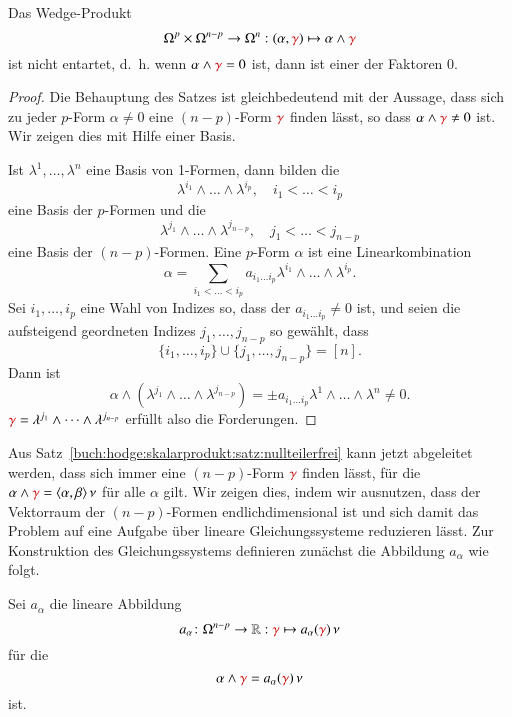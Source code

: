 \begin{satz}
\label{buch:hodge:skalarprodukt:satz:nullteilerfrei}
Das Wedge-Produkt
\[
\Omega^p \times \Omega^{n-p}
\to
\Omega^n
:
(\alpha,{\color{darkred}\gamma})
\mapsto
\alpha\wedge{\color{darkred}\gamma}
\]
ist nicht entartet, d.~h. wenn $\alpha\wedge{\color{darkred}\gamma}=0$
ist, dann ist einer der Faktoren 0.
\end{satz}

\begin{proof}
Die Behauptung des Satzes ist gleichbedeutend mit der Aussage, dass 
sich zu jeder $p$-Form $\alpha\ne 0$ eine $(n-p)$-Form ${\color{darkred}\gamma}$
finden lässt, so dass $\alpha\wedge{\color{darkred}\gamma}\ne  0$ ist.
Wir zeigen dies mit Hilfe einer Basis.

Ist $\lambda^1,\dots,\lambda^n$ eine Basis von 1-Formen, dann bilden
die
\[
\lambda^{i_1}\wedge\dots\wedge\lambda^{i_p},\quad i_1<\dots<i_p
\]
eine Basis der $p$-Formen und die
\[
\lambda^{j_1}\wedge\dots\wedge\lambda^{j_{n-p}},\quad j_1<\dots<j_{n-p}
\]
eine Basis der $(n-p)$-Formen.
Eine $p$-Form $\alpha$ ist eine Linearkombination
\[
\alpha
=
\sum_{i_1<\dots<i_p}
a_{i_1\dots i_p} \lambda^{i_1}\wedge\dots\wedge \lambda^{i_p}.
\]
Sei $i_1,\dots,i_p$ eine Wahl von Indizes so, dass
der $a_{i_1\dots i_p}\ne 0$ ist, und seien die aufsteigend geordneten
Indizes $j_1,\dots,j_{n-p}$ so gewählt, dass
\[
\{i_1,\dots,i_p\}\cup\{j_1,\dots,j_{n-p}\} = [n].
\]
Dann ist
\[
\alpha\wedge(\lambda^{j_1}\wedge\dots\wedge\lambda^{j_{n-p}})
=
\pm
a_{i_1\dots i_p} \lambda^1\wedge\dots\wedge\lambda^n
\ne
0.
\]
${\color{darkred}\gamma}=\lambda^{j_1}\wedge\dots\wedge\lambda^{j_{n-p}}$
erfüllt also die Forderungen.
\end{proof}

Aus Satz~\ref{buch:hodge:skalarprodukt:satz:nullteilerfrei} kann jetzt
abgeleitet werden, dass sich immer eine $(n-p)$-Form ${\color{darkred}\gamma}$
finden lässt, für die $\alpha\wedge{\color{darkred}\gamma}=
\langle\alpha,\beta\rangle\,\nu$ für alle $\alpha$ gilt.
Wir zeigen dies, indem wir ausnutzen, dass der Vektorraum der
$(n-p)$-Formen endlichdimensional ist und sich damit das Problem
auf eine Aufgabe über lineare Gleichungssysteme reduzieren lässt.
Zur Konstruktion des Gleichungssystems definieren zunächst die
Abbildung $a_\alpha$ wie folgt.

\begin{definition}
\label{buch:hodge:koordinatenfrei:def:hodgekoordinatenfrei}
Sei $a_\alpha$ die lineare Abbildung
\[
a_\alpha
\colon
\Omega^{n-p}
\to
\mathbb{R}
:
{\color{darkred}\gamma}
\mapsto
a_\alpha({\color{darkred}\gamma})\,\nu
\]
für die
\[
\alpha\wedge{\color{darkred}\gamma}
=
a_\alpha({\color{darkred}\gamma})\,\nu
\]
ist.
\end{definition}

